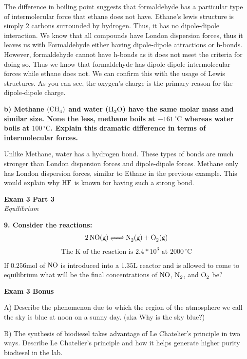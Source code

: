 \documentclass{article}
\begin{document}
    The difference in boiling point suggests that formaldehyde has a particular type of intermolecular force that ethane does not have. Ethane's lewis structure is simply 2 carbons surrounded by hydrogen. Thus, it has no dipole-dipole interaction. We know that all compounds have London dispersion forces, thus it leaves us with Formaldehyde either having dipole-dipole attractions or h-bonds. However, formaldehyde cannot have h-bonds as it does not meet the criteria for doing so. Thus we know that formaldehyde has dipole-dipole intermolecular forces while ethane does not.  We can confirm this with the usage of Lewis structures. As you can see, the oxygen's charge is the primary reason for the dipole-dipole charge.

    \textbf{b) Methane $(\ce{CH4})$ and water ($\ce{H2O}$) have the same molar mass and similar size. None the less, methane boils at $-161\,^{\circ}\mathrm{C}$  whereas water boils at $100\,^{\circ}\mathrm{C}$. Explain this  dramatic difference in terms of intermolecular forces.}

    Unlike Methane, water has a hydrogen bond. These types of bonds are much stronger than London dispersion forces and dipole-dipole forces. Methane only has London dispersion forces, similar to Ethane in the previous example. This would explain why $\ce{HF}$ is known for having such a strong bond.
    \pagebreak

    \begin{center}
        \textbf{Exam 3 Part 3}\\
        \textit{Equilibrium}
    \end{center}
    \textbf{9. Consider the reactions:}
    $$ \ce{2NO} (\si{\gram}) \ce{<=>} \ce{N2}(\si{\gram}) + \ce{O2}(\si{\gram})$$
    $$\text{The K of the reaction is } 2.4*10^{3} \text{ at }  2000\,^{\circ}\mathrm{C}$$

    If $0.256 \si{\mole}$ of $\ce{NO}$ is introduced into a $1.35 \si{\liter}$ reactor and is allowed to come to equilibrium what will be the final concentrations of $\ce{NO }$, $\ce{N2}$, and $\ce{O2}$ be?

    \pagebreak

    \begin{center}
        \textbf{Exam 3 Bonus}\\
    \end{center}

    A) Describe the phenomenon due to which the region of the atmosphere we call the sky is blue at noon on a sunny day. (aka Why is the sky blue?)

    B) The synthesis of biodiesel takes advantage of Le Chatelier's principle in two ways. Describe Le Chatelier's principle and how it helps generate higher purity biodiesel in the lab.

\end{document}
